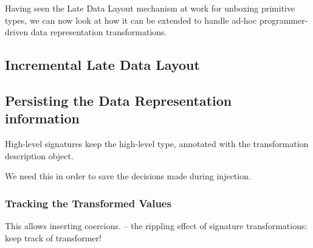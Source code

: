 Having seen the Late Data Layout mechanism at work for unboxing primitive types, we can now look at how it can be extended to handle ad-hoc programmer-driven data representation transformations.

\subsection{Incremental Late Data Layout}


%
%

\subsection{Persisting the Data Representation information}
\label{sec:ildl:signatures}

High-level signatures keep the high-level type, annotated with the transformation description object.

We need this in order to save the decisions made during injection.

\subsubsection{Tracking the Transformed Values}
This allows inserting coercions.
 -- the rippling effect of signature transformations: keep track of transformer!

